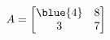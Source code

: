 \documentclass[preview]{standalone}
\begin{document}
\begin{align*}
A = \begin{bmatrix}
                        \blue{4} & 8\\
                        3 & 7
                    \end{bmatrix}
\end{align*}
\end{document}
